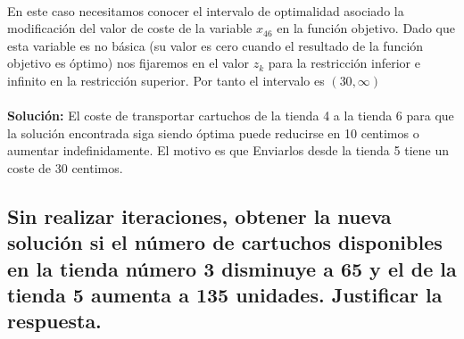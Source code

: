\documentclass[10pt, a4paper]{article}
\begin{document}
			\paragraph{}
			En este caso necesitamos conocer el intervalo de optimalidad asociado la modificación del valor de coste de la variable \(x_{46}\) en la función objetivo. Dado que esta variable es no básica (su valor es cero cuando el resultado de la función objetivo es óptimo) nos fijaremos en el valor \(z_{k}\) para la restricción inferior e infinito en la restricción superior. Por tanto el intervalo es \((30,\infty)\)

			\paragraph{}
			\textbf{Solución:} El coste de transportar cartuchos de la tienda 4 a la tienda 6 para que la solución encontrada siga siendo óptima puede reducirse en 10 centimos o aumentar indefinidamente. El motivo es que Enviarlos desde la tienda 5 tiene un coste de 30 centimos.


		\subsection{Sin realizar iteraciones, obtener la nueva solución si el número de cartuchos disponibles en la tienda número 3 disminuye a 65 y el de la tienda 5 aumenta a 135 unidades. Justificar la respuesta.}

			\paragraph{}
\end{document}
